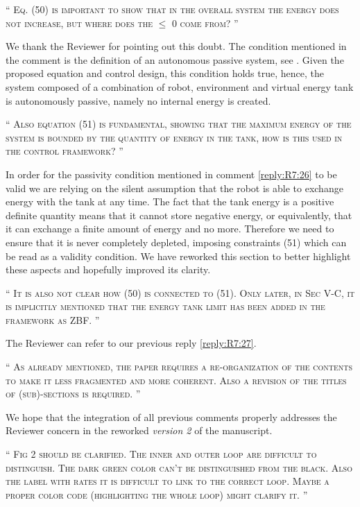 \documentclass[10pt]{article}
\newcommand{\referee}[1]{\;
  \begin{minipage}[t]{.95\textwidth}
    ``{\small\color{red} \textsc{#1}}''
  \end{minipage}\medskip
  }
\newcommand{\version}[1]{\textit{version #1}}
\begin{document}
\begin{enumerate}[label={[R7:\,\arabic{enumi}]}]
\item\label{reply:R7:26} 
\referee{Eq. (50) is important to show that in the overall system the energy does not increase, but where does the $\leq$ 0 come from? 
}

We thank the Reviewer for pointing out this doubt. The condition mentioned in the comment is the definition of an autonomous passive system, see \cite{willems1972dissipative}. Given the proposed equation and control design, this condition holds true, hence, the system composed of a combination of robot, environment and virtual energy tank is autonomously passive, namely no internal energy is created. 


\item\label{reply:R7:27} 
\referee{Also equation (51) is fundamental, showing that the maximum energy of the system is bounded by the quantity of energy in the tank, how is this used in the control framework? 
}


In order for the passivity condition mentioned in comment \ref{reply:R7:26} to be valid we are relying on the silent assumption that the robot is able to exchange energy with the tank at any time. The fact that the tank energy is a positive definite quantity means that it cannot store negative energy, or equivalently, that it can exchange a finite amount of energy and no more. Therefore we need to ensure that it is never completely depleted, imposing constraints (51) which can be read as a validity condition. We have reworked this section to better highlight these aspects and hopefully improved its clarity.


\item\label{reply:R7:28} 
\referee{It is also not clear how (50) is connected to (51). Only later, in Sec V-C, it is implicitly mentioned that the energy tank limit has been added in the framework as ZBF.
}

The Reviewer can refer to our previous reply \ref{reply:R7:27}.


\item\label{reply:R7:29} 
\referee{As already mentioned, the paper requires a re-organization of the contents to make it less fragmented and more coherent. Also a revision of the titles of (sub)-sections is required.
}

We hope that the integration of all previous comments properly addresses the Reviewer concern in the reworked \version{2} of the manuscript.


\item\label{reply:R7:30} 
\referee{Fig 2 should be clarified. The inner and outer loop are difficult to distinguish. The dark green color can't be distinguished from the black. Also the label with rates it is difficult to link to the correct loop. Maybe a proper color code (highlighting the whole loop) might clarify it. 
}


\end{enumerate}
\end{document}
